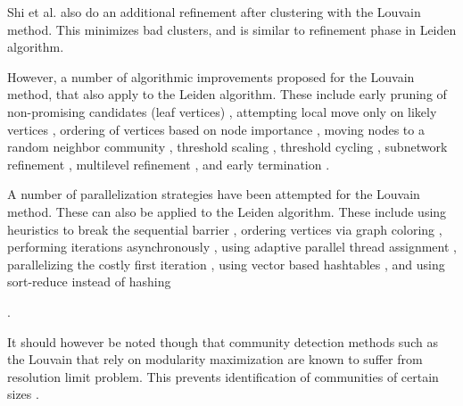 Shi et al. \cite{com-shi21} also do an additional refinement after clustering with the Louvain method. This minimizes bad clusters, and is similar to refinement phase in Leiden algorithm.


However, a number of algorithmic improvements proposed for the Louvain method, that also apply to the Leiden algorithm. These include early pruning of non-promising candidates (leaf vertices) \cite{com-ryu16, com-halappanavar17, com-zhang21, com-you22}, attempting local move only on likely vertices \cite{com-ryu16, com-ozaki16, com-zhang21, com-shi21}, ordering of vertices based on node importance \cite{com-aldabobi22}, moving nodes to a random neighbor community \cite{com-traag15}, threshold scaling \cite{com-lu15, com-naim17, com-halappanavar17}, threshold cycling \cite{com-ghosh18}, subnetwork refinement \cite{com-waltman13, com-traag19}, multilevel refinement \cite{com-rotta11, com-gach14, com-shi21}, and early termination \cite{com-ghosh18}.

A number of parallelization strategies have been attempted for the Louvain method. These can also be applied to the Leiden algorithm. These include using heuristics to break the sequential barrier \cite{com-lu15}, ordering vertices via graph coloring \cite{com-halappanavar17}, performing iterations asynchronously \cite{com-que15, com-shi21}, using adaptive parallel thread assignment \cite{com-fazlali17, com-naim17, com-sattar19, com-mohammadi20}, parallelizing the costly first iteration \cite{com-wickramaarachchi14}, using vector based hashtables \cite{com-halappanavar17}, and using sort-reduce instead of hashing \cite{com-cheong13}.It should however be noted though that community detection methods such as the Louvain that rely on modularity maximization are known to suffer from resolution limit problem. This prevents identification of communities of certain sizes \cite{com-ghosh19}.

